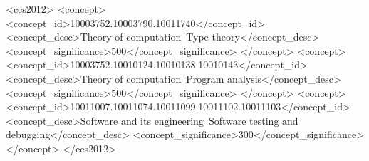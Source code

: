 \documentclass[acmsmall]{acmart}
\begin{document}




\begin{CCSXML}
<ccs2012>
   <concept>
       <concept_id>10003752.10003790.10011740</concept_id>
       <concept_desc>Theory of computation~Type theory</concept_desc>
       <concept_significance>500</concept_significance>
       </concept>
   <concept>
       <concept_id>10003752.10010124.10010138.10010143</concept_id>
       <concept_desc>Theory of computation~Program analysis</concept_desc>
       <concept_significance>500</concept_significance>
       </concept>
   <concept>
       <concept_id>10011007.10011074.10011099.10011102.10011103</concept_id>
       <concept_desc>Software and its engineering~Software testing and debugging</concept_desc>
       <concept_significance>300</concept_significance>
       </concept>
 </ccs2012>
\end{CCSXML}



\maketitle

















\end{document}
